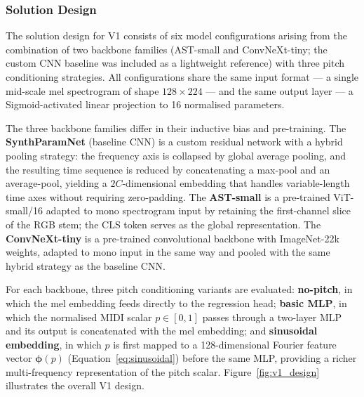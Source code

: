 \subsubsection{Solution Design}

\noindent
The solution design for V1 consists of six model configurations arising from the combination of two backbone families (AST-small and ConvNeXt-tiny; the custom CNN baseline was included as a lightweight reference) with three pitch conditioning strategies. All configurations share the same input format — a single mid-scale mel spectrogram of shape $128 \times 224$ — and the same output layer — a Sigmoid-activated linear projection to 16 normalised parameters.

\noindent \newline
The three backbone families differ in their inductive bias and pre-training. The \textbf{SynthParamNet} (baseline CNN) is a custom residual network with a hybrid pooling strategy: the frequency axis is collapsed by global average pooling, and the resulting time sequence is reduced by concatenating a max-pool and an average-pool, yielding a $2C$-dimensional embedding that handles variable-length time axes without requiring zero-padding. The \textbf{AST-small} is a pre-trained ViT-small/16 \cite{dosovitskiy2021vit, gong2021ast} adapted to mono spectrogram input by retaining the first-channel slice of the RGB stem; the CLS token serves as the global representation. The \textbf{ConvNeXt-tiny} is a pre-trained convolutional backbone \cite{liu2022convnext} with ImageNet-22k weights, adapted to mono input in the same way and pooled with the same hybrid strategy as the baseline CNN.

\noindent \newline
For each backbone, three pitch conditioning variants are evaluated: \textbf{no-pitch}, in which the mel embedding feeds directly to the regression head; \textbf{basic MLP}, in which the normalised MIDI scalar $p \in [0,1]$ passes through a two-layer MLP and its output is concatenated with the mel embedding; and \textbf{sinusoidal embedding}, in which $p$ is first mapped to a 128-dimensional Fourier feature vector $\boldsymbol{\phi}(p)$ (Equation~\ref{eq:sinusoidal}) before the same MLP, providing a richer multi-frequency representation of the pitch scalar. Figure~\ref{fig:v1_design} illustrates the overall V1 design.

